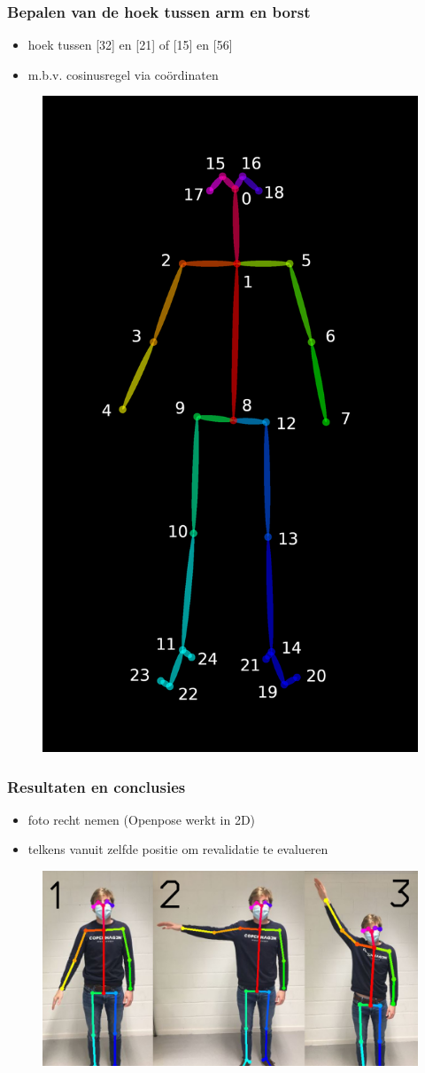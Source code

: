\documentclass
   [kulak] %
   {kulakbeamer}
\begin{document}
\begin{frame}
\frametitle{Bepalen van de hoek tussen arm en borst}
\begin{itemize}
	\item hoek tussen [32] en [21] of [15] en [56]
	\item m.b.v. cosinusregel via coördinaten
\end{itemize}
\begin{figure}
	\centering
	\includegraphics[width= .3\textwidth]{HPE_skelet}
\end{figure}
\end{frame}

\begin{frame}
\frametitle{Resultaten en conclusies}
\begin{itemize}
	\item foto recht nemen (Openpose werkt in 2D)
	\item telkens vanuit zelfde positie om revalidatie te evalueren
\end{itemize}
\begin{figure}
	\centering
	\includegraphics[width= \textwidth]{samen}
\end{figure}
\end{frame}
\end{document}

